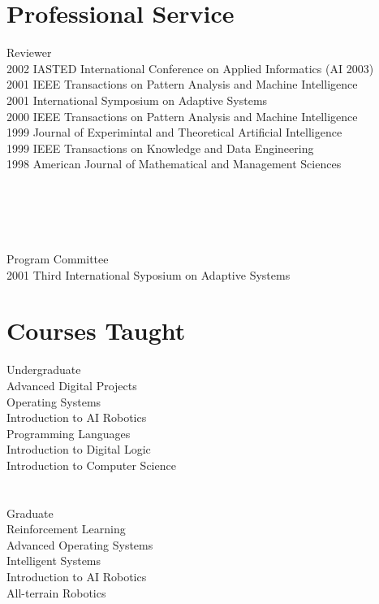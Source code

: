 \documentclass[11pt]{resume}
\begin{document}
\section{Professional Service }{Reviewer}
        {\\
2002 IASTED International Conference on Applied Informatics (AI 2003)\\
2001 IEEE Transactions on Pattern Analysis and Machine Intelligence\\
2001 International Symposium on Adaptive Systems\\
2000 IEEE Transactions on Pattern Analysis and Machine Intelligence \\ 
1999 Journal of Experimintal and Theoretical Artificial Intelligence\\
1999 IEEE Transactions on Knowledge and Data Engineering\\
\rm
1998 American Journal of Mathematical and Management Sciences\\
}

\section{\ }{Program Committee}
        {\\
2001 Third International Syposium on Adaptive Systems \\
}




\section{Courses Taught}{Undergraduate}
{\\
\hspace*{1em} Advanced Digital Projects\\
\hspace*{1em} Operating Systems\\
\hspace*{1em} Introduction to AI Robotics\\
\hspace*{1em}  Programming Languages\\
\hspace*{1em} Introduction to Digital Logic\\
\hspace*{1em} Introduction to Computer Science
}

\section{}{Graduate}
{\\
\hspace*{1em} Reinforcement Learning\\
\hspace*{1em} Advanced Operating Systems\\
\hspace*{1em} Intelligent Systems\\
\hspace*{1em} Introduction to AI Robotics\\
\hspace*{1em} All-terrain Robotics
}
\end{document}

